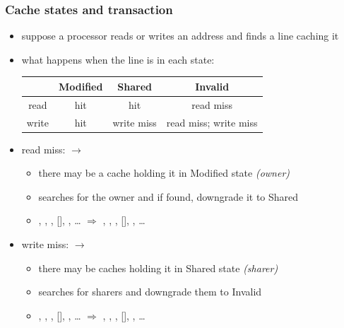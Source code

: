 \documentclass[12pt,dvipdfmx]{beamer}
\newcommand{\ao}[1]{{\color{blue}#1}}
\begin{document}
\begin{frame}
\frametitle{Cache states and transaction}

\begin{itemize}
\item suppose a processor reads or writes an address and
  finds a line caching it
\item what happens when the line is in each state:
\begin{tabular}{|c|c|c|c|}\hline
      & Modified & Shared     & Invalid   \\\hline
read  & hit      & hit        & \ao{read miss} \\
write & hit      & \ao{write miss} & \ao{read miss; write miss} \\\hline
\end{tabular}

\item<2-> \ao{read miss:} $\rightarrow$ 
  \begin{itemize}
  \item there may be a cache holding it in Modified state \ao{\em (owner)}
  \item searches for the owner and if found, downgrade it to Shared
  \item 
\Ibox , \Mbox , \Ibox , [\Ibox], \Ibox , \ldots
$\Rightarrow$ 
\Ibox , \Shbox , \Ibox , [\Shbox], \Ibox , \ldots
  \end{itemize}
\item<3-> \ao{write miss:} $\rightarrow$
  \begin{itemize}
  \item there may be caches holding it in Shared state \ao{\em (sharer)}
  \item searches for sharers and downgrade them to Invalid
  \item 
\Shbox , \Ibox , \Shbox , [\Shbox], \Ibox , \ldots
$\Rightarrow$ 
\Ibox , \Ibox , \Ibox , [\Mbox], \Ibox , \ldots
  \end{itemize}
\end{itemize}
\end{frame}
\end{document}
